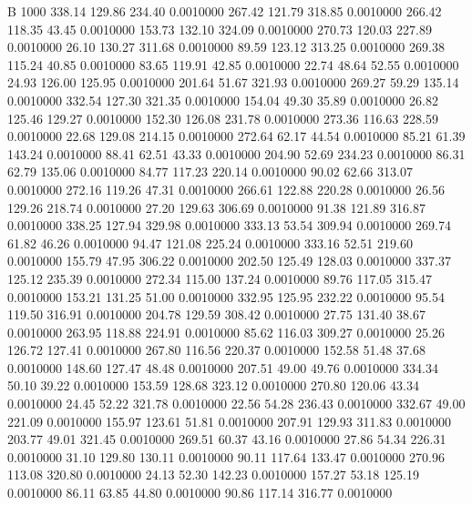


B 1000
 338.14  129.86  234.40   0.0010000
 267.42  121.79  318.85   0.0010000
 266.42  118.35   43.45   0.0010000
 153.73  132.10  324.09   0.0010000
 270.73  120.03  227.89   0.0010000
  26.10  130.27  311.68   0.0010000
  89.59  123.12  313.25   0.0010000
 269.38  115.24   40.85   0.0010000
  83.65  119.91   42.85   0.0010000
  22.74   48.64   52.55   0.0010000
  24.93  126.00  125.95   0.0010000
 201.64   51.67  321.93   0.0010000
 269.27   59.29  135.14   0.0010000
 332.54  127.30  321.35   0.0010000
 154.04   49.30   35.89   0.0010000
  26.82  125.46  129.27   0.0010000
 152.30  126.08  231.78   0.0010000
 273.36  116.63  228.59   0.0010000
  22.68  129.08  214.15   0.0010000
 272.64   62.17   44.54   0.0010000
  85.21   61.39  143.24   0.0010000
  88.41   62.51   43.33   0.0010000
 204.90   52.69  234.23   0.0010000
  86.31   62.79  135.06   0.0010000
  84.77  117.23  220.14   0.0010000
  90.02   62.66  313.07   0.0010000
 272.16  119.26   47.31   0.0010000
 266.61  122.88  220.28   0.0010000
  26.56  129.26  218.74   0.0010000
  27.20  129.63  306.69   0.0010000
  91.38  121.89  316.87   0.0010000
 338.25  127.94  329.98   0.0010000
 333.13   53.54  309.94   0.0010000
 269.74   61.82   46.26   0.0010000
  94.47  121.08  225.24   0.0010000
 333.16   52.51  219.60   0.0010000
 155.79   47.95  306.22   0.0010000
 202.50  125.49  128.03   0.0010000
 337.37  125.12  235.39   0.0010000
 272.34  115.00  137.24   0.0010000
  89.76  117.05  315.47   0.0010000
 153.21  131.25   51.00   0.0010000
 332.95  125.95  232.22   0.0010000
  95.54  119.50  316.91   0.0010000
 204.78  129.59  308.42   0.0010000
  27.75  131.40   38.67   0.0010000
 263.95  118.88  224.91   0.0010000
  85.62  116.03  309.27   0.0010000
  25.26  126.72  127.41   0.0010000
 267.80  116.56  220.37   0.0010000
 152.58   51.48   37.68   0.0010000
 148.60  127.47   48.48   0.0010000
 207.51   49.00   49.76   0.0010000
 334.34   50.10   39.22   0.0010000
 153.59  128.68  323.12   0.0010000
 270.80  120.06   43.34   0.0010000
  24.45   52.22  321.78   0.0010000
  22.56   54.28  236.43   0.0010000
 332.67   49.00  221.09   0.0010000
 155.97  123.61   51.81   0.0010000
 207.91  129.93  311.83   0.0010000
 203.77   49.01  321.45   0.0010000
 269.51   60.37   43.16   0.0010000
  27.86   54.34  226.31   0.0010000
  31.10  129.80  130.11   0.0010000
  90.11  117.64  133.47   0.0010000
 270.96  113.08  320.80   0.0010000
  24.13   52.30  142.23   0.0010000
 157.27   53.18  125.19   0.0010000
  86.11   63.85   44.80   0.0010000
  90.86  117.14  316.77   0.0010000
